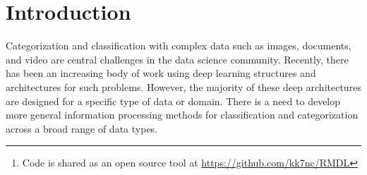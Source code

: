 \documentclass[sigconf, final]{acmart}
\begin{document}
\begin{abstract}
The continually increasing number of complex datasets each year necessitates ever improving machine learning methods for robust and accurate categorization of these data. This paper introduces Random Multimodel Deep Learning~(RMDL): a new ensemble, deep learning approach for classification. Deep learning models have achieved state-of-the-art results across many domains.  RMDL solves the problem of finding the best deep learning structure and architecture while simultaneously improving robustness and accuracy through ensembles of deep learning architectures. RDML can accept as input a variety data to include text, video, images, and symbolic. This paper describes RMDL and shows test results for image and text data including MNIST, CIFAR-10, WOS, Reuters, IMDB, and 20newsgroup. These test results show that RDML produces consistently better performance than standard methods over a broad range of data types and classification problems.\footnote{Code is shared as an open source tool at \url{https://github.com/kk7nc/RMDL}}
\end{abstract}







\maketitle

\section{Introduction}\label{sec:introduction}
Categorization and classification with complex data such as images, documents, and video are central challenges in the data science community. Recently, there has been an increasing body of work using deep learning structures and architectures for such problems. %
However, the majority of these deep architectures are designed for a specific type of data or domain. There is a need to develop more general information processing methods for classification and categorization across a broad range of data types. 
\end{document}

